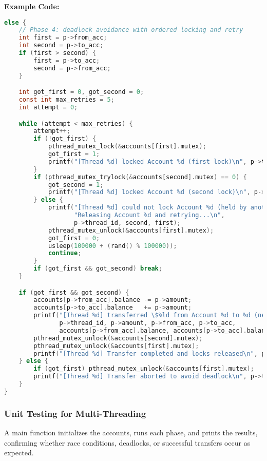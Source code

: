 \documentclass[11pt]{article}
\begin{document}
\textbf{Example Code:}
\begin{lstlisting}[language=C]
else {
    // Phase 4: deadlock avoidance with ordered locking and retry
    int first = p->from_acc;
    int second = p->to_acc;
    if (first > second) {
        first = p->to_acc;
        second = p->from_acc;
    }

    int got_first = 0, got_second = 0;
    const int max_retries = 5;
    int attempt = 0;

    while (attempt < max_retries) {
        attempt++;
        if (!got_first) {
            pthread_mutex_lock(&accounts[first].mutex);
            got_first = 1;
            printf("[Thread %d] locked Account %d (first lock)\n", p->thread_id, first);
        }
        if (pthread_mutex_trylock(&accounts[second].mutex) == 0) {
            got_second = 1;
            printf("[Thread %d] locked Account %d (second lock)\n", p->thread_id, second);
        } else {
            printf("[Thread %d] could not lock Account %d (held by another thread). "
                   "Releasing Account %d and retrying...\n",
                   p->thread_id, second, first);
            pthread_mutex_unlock(&accounts[first].mutex);
            got_first = 0;
            usleep(100000 + (rand() % 100000));
            continue;
        }
        if (got_first && got_second) break;
    }

    if (got_first && got_second) {
        accounts[p->from_acc].balance -= p->amount;
        accounts[p->to_acc].balance   += p->amount;
        printf("[Thread %d] transferred \$%ld from Account %d to %d (new balances: %ld, %ld)\n",
               p->thread_id, p->amount, p->from_acc, p->to_acc,
               accounts[p->from_acc].balance, accounts[p->to_acc].balance);
        pthread_mutex_unlock(&accounts[second].mutex);
        pthread_mutex_unlock(&accounts[first].mutex);
        printf("[Thread %d] Transfer completed and locks released\n", p->thread_id);
    } else {
        if (got_first) pthread_mutex_unlock(&accounts[first].mutex);
        printf("[Thread %d] Transfer aborted to avoid deadlock\n", p->thread_id);
    }
}
\end{lstlisting}

\subsubsection{Unit Testing for Multi-Threading}
A main function initializes the accounts, runs each phase, and prints the results, confirming whether race conditions, deadlocks, or successful transfers occur as expected.
\end{document}
